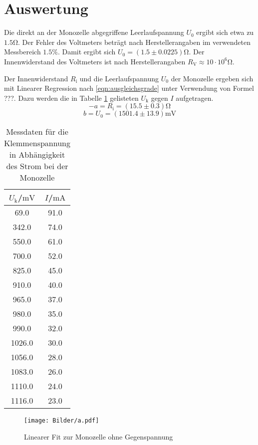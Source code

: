 \section{Auswertung}
\label{sec:Auswertung}
Die direkt an der Monozelle abgegriffene Leerlaufspannung $U_\text{0}$ ergibt sich etwa zu $1.5 \si{\ohm}$.
Der Fehler des Voltmeters beträgt nach Herstellerangaben im verwendeten Messbereich $1.5\%$.
Damit ergibt sich $U_\text{0}=(1.5 \pm 0.0225) \si{\ohm}$.
Der Innenwiderstand des Voltmeters ist nach Herstellerangaben $R_\text{V}\approx 10 \cdot 10^6 \si{\ohm}$.

Der Innenwiderstand $R_\text{i}$ und die Leerlaufspannung $U_\text{0}$ der Monozelle ergeben sich mit Linearer Regression nach \eqref{eqn:ausgleichsgrade} unter Verwendung von Formel ???.
Dazu werden die in Tabelle \ref{tab:monozelle} gelisteten $U_\text{k}$ gegen $I$ aufgetragen.
\begin{equation*}
  -a= R_\text{i}=(15.5\pm0.3)\si{\ohm}
\end{equation*}
\begin{equation*}
  b =U_\text{0}=(1501.4\pm13.9)\si{\milli\volt}
\end{equation*}


\begin{table}
  \centering
  \label{tab:monozelle}
  \caption{Messdaten für die Klemmenspannung in Abhängigkeit des Strom bei der Monozelle}
\begin{tabular}{cc}
  \toprule
$U_\text{k}$/$\si{\milli\volt}$ & $I$/$\si{\milli\ampere}$\\
\midrule
69.0 & 91.0 \\
342.0 & 74.0 \\
550.0 & 61.0 \\
700.0 & 52.0 \\
825.0 & 45.0 \\
910.0 & 40.0 \\
965.0 & 37.0 \\
980.0 & 35.0 \\
990.0 & 32.0 \\
1026.0 & 30.0 \\
1056.0 & 28.0 \\
1083.0 & 26.0 \\
1110.0 & 24.0 \\
1116.0 & 23.0 \\
\bottomrule
\end{tabular}
\end{table}
\begin{figure}
\texttt{[image: Bilder/a.pdf]}
\caption{Linearer Fit zur Monozelle ohne Gegenspannung}
\label{fig:plot_a}
\end{figure}


